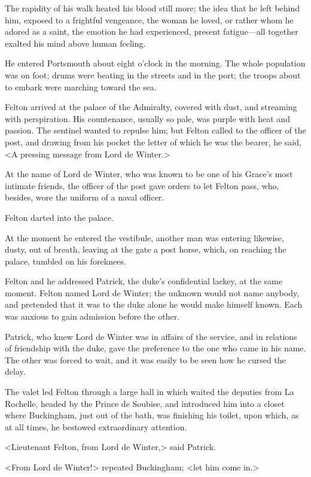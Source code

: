 The rapidity of his walk heated his blood still more; the idea that he left behind him, exposed to a frightful vengeance, the woman he loved, or rather whom he adored as a saint, the emotion he had experienced, present fatigue---all together exalted his mind above human feeling. 

He entered Portsmouth about eight o'clock in the morning. The whole population was on foot; drums were beating in the streets and in the port; the troops about to embark were marching toward the sea. 

Felton arrived at the palace of the Admiralty, covered with dust, and streaming with perspiration. His countenance, usually so pale, was purple with heat and passion. The sentinel wanted to repulse him; but Felton called to the officer of the post, and drawing from his pocket the letter of which he was the bearer, he said, <A pressing message from Lord de Winter.> 

At the name of Lord de Winter, who was known to be one of his Grace's most intimate friends, the officer of the post gave orders to let Felton pass, who, besides, wore the uniform of a naval officer. 

Felton darted into the palace. 

At the moment he entered the vestibule, another man was entering likewise, dusty, out of breath, leaving at the gate a post horse, which, on reaching the palace, tumbled on his foreknees. 

Felton and he addressed Patrick, the duke's confidential lackey, at the same moment. Felton named Lord de Winter; the unknown would not name anybody, and pretended that it was to the duke alone he would make himself known. Each was anxious to gain admission before the other. 

Patrick, who knew Lord de Winter was in affairs of the service, and in relations of friendship with the duke, gave the preference to the one who came in his name. The other was forced to wait, and it was easily to be seen how he cursed the delay. 

The valet led Felton through a large hall in which waited the deputies from La Rochelle, headed by the Prince de Soubise, and introduced him into a closet where Buckingham, just out of the bath, was finishing his toilet, upon which, as at all times, he bestowed extraordinary attention. 

<Lieutenant Felton, from Lord de Winter,> said Patrick. 

<From Lord de Winter!> repeated Buckingham; <let him come in.> 

